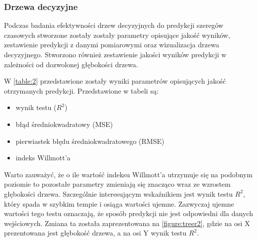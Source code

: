 \documentclass[10pt,a4paper]{article}
\begin{document}
\subsubsection{Drzewa decyzyjne}
Podczas badania efektywności drzew decyzyjnych do predykcji szeregów czasowych stworzone zostały zostały parametry opisujące jakość wyników, zestawienie predykcji z danymi pomiarowymi oraz wizualizacja drzewa decyzyjnego. Stworzono również zestawienie jakości wyników predykcji w zależności od dozwolonej głębokości drzewa. 

W \autoref{table:2} przedstawione zostały wyniki parametrów opisujących jakość otrzymanych predykcji. Przedstawione w tabeli są:
\begin{center}
	\begin{itemize}
		\item wynik testu ($R^2$)
		\item błąd średniokwadratowy (MSE)
		\item pierwiastek błędu średniokwadratowego (RMSE)
		\item indeks Willmott'a
	\end{itemize}
\end{center}
Warto zauważyć, że o ile wartość indeksu Willmott'a utrzymuje się na podobnym poziomie to pozostałe parametry zmieniają się znacząco wraz ze wzrostem głębokości drzewa. Szczególnie interesującym wskaźnikiem jest wynik testu $R^2$, który spada w szybkim tempie i osiąga wartości ujemne. Zazwyczaj ujemne wartości tego testu oznaczają, że sposób predykcji nie jest odpowiedni dla danych wejściowych. Zmiana ta została zaprezentowana na \autoref{figure:treer2}, gdzie na osi X prezentowana jest głębokość drzewa, a na osi Y wynik testu $R^2$.
\end{document}
